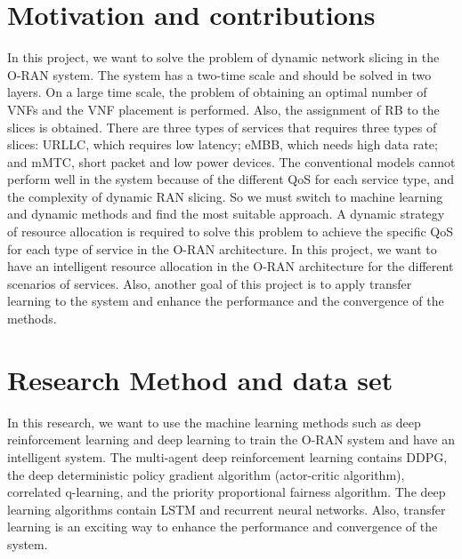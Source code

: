 \documentclass{article}
\begin{document}
\section{Motivation and contributions}
In this project, we want to solve the problem of dynamic network slicing in the O-RAN system. The system has a two-time scale and should be solved in two layers. On a large time scale, the problem of obtaining an optimal number of VNFs and the VNF placement is performed. Also, the assignment of RB to the slices is obtained. There are three types of services that requires three types of slices: URLLC, which requires low latency; eMBB, which needs high data rate; and mMTC, short packet and low power devices.
The conventional models cannot perform well in the system because of the different QoS for each service type, and the complexity of dynamic RAN slicing. So we must switch to machine learning and dynamic methods and find the most suitable approach.  
A dynamic strategy of resource allocation is required to solve this problem to achieve the specific QoS for each type of service in the O-RAN architecture.
In this project, we want to have an intelligent resource allocation in the O-RAN architecture for the different scenarios of services. 
Also, another goal of this project is to apply transfer learning to the system and enhance the performance and the convergence of the methods. 
\section{Research Method and data set}
In this research, we want to use the machine learning methods such as deep reinforcement learning and deep learning to train the O-RAN system and have an intelligent system. The multi-agent deep reinforcement learning contains DDPG, the deep deterministic policy gradient algorithm (actor-critic algorithm), correlated q-learning, and the priority proportional fairness algorithm. 
The deep learning algorithms contain LSTM and recurrent neural networks. Also, transfer learning is an exciting way to enhance the performance and convergence of the system.


 




\vspace{20mm}
\end{document}
